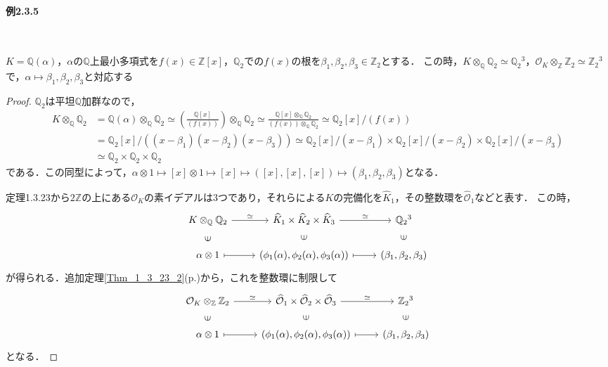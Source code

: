 \paragraph{例2.3.5}~
\begin{screen}
  $K=\mathbb{Q}(\alpha)$，$\alpha$の$\mathbb{Q}$上最小多項式を$f(x)\in\mathbb{Z}[x]$，$\mathbb{Q}_2$での$f(x)$の根を$\beta_1, \beta_2, \beta_3\in\mathbb{Z}_2$とする．
  この時，$K\otimes_\mathbb{Q}\mathbb{Q}_2\simeq\mathbb{Q}_2{}^3$，$\mathcal{O}_K\otimes_\mathbb{Z}\mathbb{Z}_2\simeq\mathbb{Z}_2{}^3$で，$\alpha\mapsto\beta_1, \beta_2, \beta_3$と対応する
\end{screen}
\begin{proof}
  $\mathbb{Q}_2$は平坦$\mathbb{Q}$加群なので，
  \begin{align*}
    K \otimes_\mathbb{Q} \mathbb{Q}_2 &= \mathbb{Q}(\alpha) \otimes_\mathbb{Q} \mathbb{Q}_2 \simeq \left( \frac{\mathbb{Q}[x]}{(f(x))} \right) \otimes_\mathbb{Q} \mathbb{Q}_2 \simeq \frac{\mathbb{Q}[x] \otimes_\mathbb{Q} \mathbb{Q}_2}{(f(x)) \otimes_\mathbb{Q} \mathbb{Q}_2} \simeq \mathbb{Q}_2[x]/(f(x)) \\
    &= \mathbb{Q}_2[x]/((x - \beta_1)(x - \beta_2)(x - \beta_3)) \simeq \mathbb{Q}_2[x]/(x - \beta_1) \times \mathbb{Q}_2[x]/(x - \beta_2) \times \mathbb{Q}_2[x]/(x - \beta_3) \\
    &\simeq \mathbb{Q}_2 \times \mathbb{Q}_2 \times \mathbb{Q}_2
  \end{align*}
  である．この同型によって，$\alpha \otimes 1 \mapsto [x] \otimes 1 \mapsto [x] \mapsto ([x], [x], [x]) \mapsto (\beta_1, \beta_2, \beta_3)$となる．

  定理1.3.23から$2\mathbb{Z}$の上にある$\mathcal{O}_K$の素イデアルは$3$つであり，それらによる$K$の完備化を$\widehat{K}_1$，その整数環を$\widehat{\mathcal{O}}_1$などと表す．
  この時，
  \[
  \begin{tikzcd}
    K \otimes_\mathbb{Q} \mathbb{Q}_2 \arrow[r, "\simeq"]\arrow[d, phantom, "\ni" sloped] & \widehat{K}_1 \times \widehat{K}_2 \times \widehat{K}_3 \arrow[r, "\simeq"]\arrow[d, phantom, "\ni" sloped] & \mathbb{Q}_2{}^3\arrow[d, phantom, "\ni" sloped] \\
    \alpha \otimes 1 \arrow[r, mapsto] & (\phi_1(\alpha), \phi_2(\alpha), \phi_3(\alpha)) \arrow[r, mapsto] & (\beta_1, \beta_2, \beta_3)
  \end{tikzcd}
  \]
  が得られる．追加定理\ref{Thm_1_3_23_2}(p.\pageref{Thm_1_3_23_2})から，これを整数環に制限して
  \[
  \begin{tikzcd}
    \mathcal{O}_K \otimes_\mathbb{Z} \mathbb{Z}_2 \arrow[r, "\simeq"]\arrow[d, phantom, "\ni" sloped] & \widehat{\mathcal{O}}_1 \times \widehat{\mathcal{O}}_2 \times \widehat{\mathcal{O}}_3 \arrow[r, "\simeq"]\arrow[d, phantom, "\ni" sloped] & \mathbb{Z}_2{}^3\arrow[d, phantom, "\ni" sloped] \\
    \alpha \otimes 1 \arrow[r, mapsto] & (\phi_1(\alpha), \phi_2(\alpha), \phi_3(\alpha)) \arrow[r, mapsto] & (\beta_1, \beta_2, \beta_3)
  \end{tikzcd}
  \]
  となる．
\end{proof}

